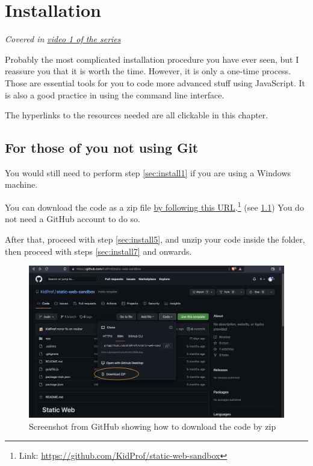 \chapter{Installation}
\label{sec:install}

\textit{Covered in \href{https://www.youtube.com/watch?v=oIsH0V3fRt8&list=PLjGmdnqrOKuYXiu7lgG5HW71jPEUd1XCm&index=2}{video 1 of the series}}
\vspace{6mm}

Probably the most complicated installation procedure you have ever seen, but I reassure you that it is worth the time. However, it is only a one-time process. Those are essential tools for you to code more advanced stuff using JavaScript. It is also a good practice in using the command line interface.

The hyperlinks to the resources needed are all clickable in this chapter.

\section*{For those of you not using Git}

You would still need to perform step \cref{sec:install1} if you are using a Windows machine.

You can download the code as a zip file \href{https://github.com/KidProf/static-web-sandbox}{by following this URL}.\footnote{Link: \url{https://github.com/KidProf/static-web-sandbox}} (see \cref{fig:githubzip}) You do not need a GitHub account to do so. 

After that, proceed with step \cref{sec:install5}, and unzip your code inside the folder, then proceed with steps \cref{sec:install7} and onwards.

\begin{figure}[h]
\centering
\includegraphics[width=15cm]{images/ch1-download-as-zip.png}
\caption{Screenshot from GitHub showing how to download the code by zip}
\label{fig:githubzip}
\end{figure}

